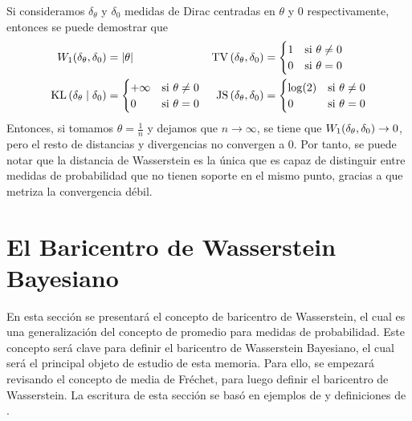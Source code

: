 {{\begin{example}
		  Si consideramos $\delta_\theta$ y $\delta_0$ medidas de Dirac centradas en $\theta$ y $0$ respectivamente, entonces se puede demostrar que
		  \begin{align*}
			  \Wasserstein[1]{\delta_\theta}{\delta_0} & = |\theta|                            &
			  \TV{\delta_\theta}{\delta_0}             & = \begin{cases}
				                                               1 & \text{si } \theta \neq 0 \\
				                                               0 & \text{si } \theta = 0
			                                               \end{cases}          \\
			  \KL{\delta_\theta}{\delta_0}             & = \begin{cases}
				                                               +\infty & \text{si } \theta \neq 0 \\
				                                               0       & \text{si } \theta = 0
			                                               \end{cases} &
			  \JS{\delta_\theta}{\delta_0}             & = \begin{cases}
				                                               \log(2) & \text{si } \theta \neq 0 \\
				                                               0       & \text{si } \theta = 0
			                                               \end{cases}
		  \end{align*}
		  Entonces, si tomamos $\theta = \frac{1}{n} $ y dejamos que $n \to \infty$, se tiene que $\Wasserstein[1]{\delta_\theta}{\delta_0} \to 0$, pero el resto de distancias y divergencias no convergen a 0.
		  Por tanto, se puede notar que la distancia de Wasserstein es la única que es capaz de distinguir entre medidas de probabilidad que no tienen soporte en el mismo punto, gracias a que metriza la convergencia débil.
	  \end{example}

  }  %

  \section{El Baricentro de Wasserstein Bayesiano}\label{sec:el-baricentro-de-Wasserstein-Bayesiano}
  {
	  En esta sección se presentará el concepto de baricentro de Wasserstein, el cual es una generalización del concepto de promedio para medidas de probabilidad. Este concepto será clave para definir el baricentro de Wasserstein Bayesiano, el cual será el principal objeto de estudio de esta memoria. Para ello, se empezará revisando el concepto de media de Fréchet, para luego definir el baricentro de Wasserstein. La escritura de esta sección se basó en ejemplos de \cite{panaretos2020invitation} y definiciones de \cite{peyre2019computational}.

}}
